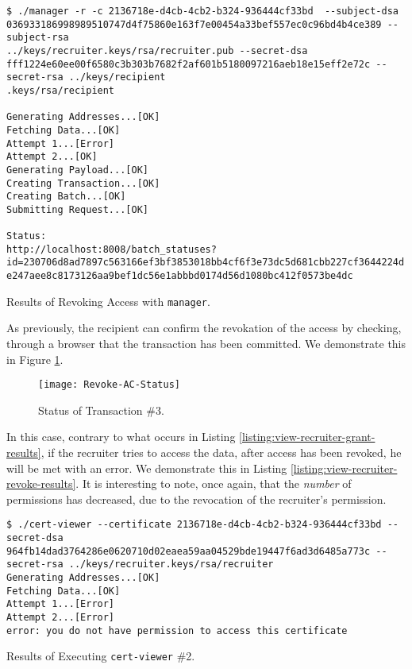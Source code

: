 \begin{listing}[ht]
	\begin{verbatim}
$ ./manager -r -c 2136718e-d4cb-4cb2-b324-936444cf33bd  --subject-dsa 036933186998989510747d4f75860e163f7e00454a33bef557ec0c96bd4b4ce389 --subject-rsa
../keys/recruiter.keys/rsa/recruiter.pub --secret-dsa fff1224e60ee00f6580c3b303b7682f2af601b5180097216aeb18e15eff2e72c --secret-rsa ../keys/recipient
.keys/rsa/recipient

Generating Addresses...[OK]
Fetching Data...[OK]
Attempt 1...[Error]
Attempt 2...[OK]
Generating Payload...[OK]
Creating Transaction...[OK]
Creating Batch...[OK]
Submitting Request...[OK]

Status:
http://localhost:8008/batch_statuses?id=230706d8ad7897c563166ef3bf3853018bb4cf6f3e73dc5d681cbb227cf3644224d
e247aee8c8173126aa9bef1dc56e1abbbd0174d56d1080bc412f0573be4dc
\end{verbatim}
	\caption{Results of Revoking Access with \texttt{manager}.}
	\label{listing:revoke-ac-results}
\end{listing}

As previously, the recipient can confirm the revokation of the access by checking, through a browser that the transaction has been committed. We demonstrate this in Figure \ref{fig:revoke-ac-status}.

\begin{figure}[htb]
	\centering
	\texttt{[image: Revoke-AC-Status]}
	\caption{Status of Transaction \#3.}
	\label{fig:revoke-ac-status}
\end{figure}

In this case, contrary to what occurs in Listing \ref{listing:view-recruiter-grant-results}, if the recruiter tries to access the data, after access has been revoked, he will be met with an error. We demonstrate this in Listing \ref{listing:view-recruiter-revoke-results}. It is interesting to note, once again, that the \emph{number} of permissions has decreased, due to the revocation of the recruiter's permission.

\begin{listing}[ht]
	\begin{verbatim}
$ ./cert-viewer --certificate 2136718e-d4cb-4cb2-b324-936444cf33bd --secret-dsa 964fb14dad3764286e0620710d02eaea59aa04529bde19447f6ad3d6485a773c --secret-rsa ../keys/recruiter.keys/rsa/recruiter
Generating Addresses...[OK]
Fetching Data...[OK]
Attempt 1...[Error]
Attempt 2...[Error]
error: you do not have permission to access this certificate
\end{verbatim}
	\caption{Results of Executing \texttt{cert-viewer} \#2.}
	\label{listing:view-recruiter-revoke-results}
\end{listing}

